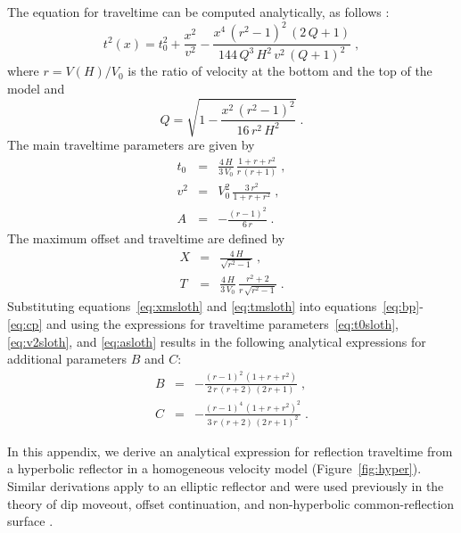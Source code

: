 The equation for traveltime can be computed analytically, as follows
\cite[]{cerveny}:
\begin{equation}
  t^2(x) = t_0^2 + \frac{x^2}{v^2} - 
  \frac{x^4\,(r^2-1)^2\,(2\,Q+1)}{144\,Q^3\,H^2\,v^2\,(Q+1)^2}\;,
\end{equation}
where  $r=V(H)/V_0$ is the
ratio of velocity at the bottom and the top of the model and
\[
Q = \sqrt{1-\frac{x^2\,(r^2-1)^2}{16\,r^2\,H^2}}\;.
\]
The main traveltime parameters are given by
\begin{eqnarray}
  \label{eq:t0sloth}
  t_0 & = & \frac{4\,H}{3\,V_0}\,\frac{1+r+r^2}{r\,(r+1)}\;, \\
  \label{eq:v2sloth}
  v^2 & = & V_0^2\,\frac{3\,r^2}{1+r+r^2}\;, \\
  \label{eq:asloth}
  A & = & -\frac{(r-1)^2}{6\,r}\;.
\end{eqnarray}
The maximum offset and traveltime are defined by
\begin{eqnarray}
  \label{eq:xmsloth}
  X & = & \frac{4\,H}{\sqrt{r^2-1}}\;, \\
  \label{eq:tmsloth}
  T & = & \frac{4\,H}{3\,V_0}\,\frac{r^2+2}{r\,\sqrt{r^2-1}}\;.
\end{eqnarray}
Substituting equations~\ref{eq:xmsloth} and \ref{eq:tmsloth} into
equations~\ref{eq:bp}-\ref{eq:cp} and using the expressions for
traveltime parameters~\ref{eq:t0sloth}, \ref{eq:v2sloth}, and
\ref{eq:asloth} results in the following analytical expressions for
additional parameters $B$ and $C$:
\begin{eqnarray}
\label{eq:bsloth}
B & = & - \frac{(r-1)^2\,(1+r+r^2)}{2\,r\,(r+2)\,(2\,r+1)}\;, \\
\label{eq:csloth}
C & = & - \frac{(r-1)^4\,(1+r+r^2)^2}{3\,r\,(r+2)\,(2\,r+1)^2}\;.
\end{eqnarray}


In this appendix, we derive an analytical expression for reflection
traveltime from a hyperbolic reflector in a homogeneous velocity
model (Figure~\ref{fig:hyper}). Similar derivations apply to an elliptic reflector and were
used previously in the theory of dip moveout, offset continuation, and
non-hyperbolic common-reflection surface
\cite[]{stovas,GEO68-02-07180732,crs}.


